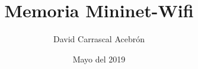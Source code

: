 \documentclass{book}
\title{Memoria Mininet-Wifi}
\author{David Carrascal Acebrón}
\date{Mayo del 2019}
\begin{document}
\maketitle
\tableofcontents{}
 
 
\end{document}
